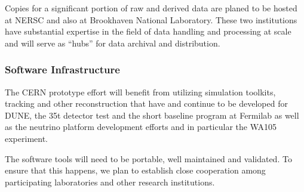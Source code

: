 Copies for a significant portion of raw and derived data are planed to be hosted at NERSC and also at Brookhaven National Laboratory.
These two institutions have substantial expertise  in the field of data handling and processing at scale and will serve as ``hubs'' for data archival and distribution.


\subsubsection{Software Infrastructure}

The CERN prototype effort will benefit from utilizing simulation toolkits, tracking and other reconstruction
that have and continue to be developed for DUNE, the 35t detector test and the short baseline program at Fermilab as well as the 
neutrino platform development efforts and in particular the WA105 experiment.

The software tools will need to be portable, well maintained and validated. To ensure that this happens,
we plan to establish close cooperation among participating laboratories and other research institutions.



%

